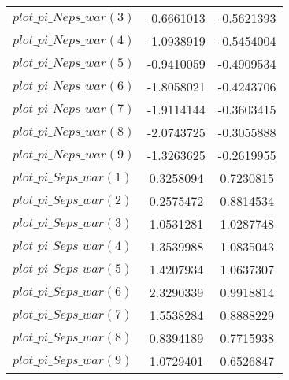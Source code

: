 \begin{center}
\begin{longtable}{lcc}
$plot\_pi\_N eps\_war (3)   $	 & 	     -0.6661013	 & 	     -0.5621393 \\ 
$plot\_pi\_N eps\_war (4)   $	 & 	     -1.0938919	 & 	     -0.5454004 \\ 
$plot\_pi\_N eps\_war (5)   $	 & 	     -0.9410059	 & 	     -0.4909534 \\ 
$plot\_pi\_N eps\_war (6)   $	 & 	     -1.8058021	 & 	     -0.4243706 \\ 
$plot\_pi\_N eps\_war (7)   $	 & 	     -1.9114144	 & 	     -0.3603415 \\ 
$plot\_pi\_N eps\_war (8)   $	 & 	     -2.0743725	 & 	     -0.3055888 \\ 
$plot\_pi\_N eps\_war (9)   $	 & 	     -1.3263625	 & 	     -0.2619955 \\ 
$plot\_pi\_S eps\_war (1)   $	 & 	      0.3258094	 & 	      0.7230815 \\ 
$plot\_pi\_S eps\_war (2)   $	 & 	      0.2575472	 & 	      0.8814534 \\ 
$plot\_pi\_S eps\_war (3)   $	 & 	      1.0531281	 & 	      1.0287748 \\ 
$plot\_pi\_S eps\_war (4)   $	 & 	      1.3539988	 & 	      1.0835043 \\ 
$plot\_pi\_S eps\_war (5)   $	 & 	      1.4207934	 & 	      1.0637307 \\ 
$plot\_pi\_S eps\_war (6)   $	 & 	      2.3290339	 & 	      0.9918814 \\ 
$plot\_pi\_S eps\_war (7)   $	 & 	      1.5538284	 & 	      0.8888229 \\ 
$plot\_pi\_S eps\_war (8)   $	 & 	      0.8394189	 & 	      0.7715938 \\ 
$plot\_pi\_S eps\_war (9)   $	 & 	      1.0729401	 & 	      0.6526847 \\ 
\end{longtable}
 \end{center}
